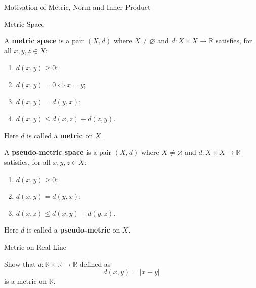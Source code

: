 \documentclass[12pt, a4paper]{article}
\begin{document}
\FrontPage
\Large

\begin{heading}
    Motivation of Metric, Norm and Inner Product
\end{heading}

\clearpage

\begin{heading}
    Metric Space
\end{heading}

\vspace{10pt}

\begin{definition}
    A \textbf{metric space} is a pair $(X,d)$ where $X\neq\varnothing$ and
    $d:X\times X\to\mathbb{R}$ satisfies, for all $x,y,z\in X$:
    \begin{enumerate}[label=(M\arabic*)]
    \item $d(x,y)\ge 0$;
    \item $d(x,y)=0 \iff x=y$;
    \item $d(x,y)=d(y,x)$;
    \item $d(x,y)\le d(x,z)+d(z,y)$.
    \end{enumerate}
    Here $d$ is called a \textbf{metric} on $X$.
\end{definition}

\clearpage

\clearpage

\begin{definition}
    A \textbf{pseudo-metric space} is a pair $(X,d)$ where $X\neq\varnothing$ and
    $d:X\times X\to\mathbb{R}$ satisfies, for all $x,y,z\in X$:
    \begin{enumerate}[label=(PM\arabic*)]
    \item $d(x,y)\ge 0$;
    \item $d(x,y)=d(y,x)$;
    \item $d(x,z)\le d(x,y)+d(y,z)$.
    \end{enumerate}
    Here $d$ is called a \textbf{pseudo-metric} on $X$.
\end{definition}

\clearpage

\begin{heading}
    Metric on Real Line
\end{heading}

\vspace{10pt}

\begin{theorem}
    Show that $d:\mathbb{R}\times\mathbb{R}\to\mathbb{R}$ defined as
    \[
        d(x,y)=|x-y|
    \]
    is a metric on $\mathbb{R}$.
\end{theorem}
\end{document}
